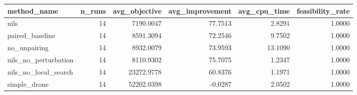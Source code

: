 \begin{tabular}{lrrrrr}
\toprule
method_name & n_runs & avg_objective & avg_improvement & avg_cpu_time & feasibility_rate \\
\midrule
nils & 14 & 7190.0047 & 77.7513 & 2.8291 & 1.0000 \\
paired_baseline & 14 & 8591.3094 & 72.2546 & 9.7502 & 1.0000 \\
no_unpairing & 14 & 8932.0079 & 73.9593 & 13.1090 & 1.0000 \\
nils_no_perturbation & 14 & 8110.9302 & 75.7075 & 1.2347 & 1.0000 \\
nils_no_local_search & 14 & 23272.9778 & 60.8376 & 1.1971 & 1.0000 \\
simple_drone & 14 & 52202.0398 & -0.0287 & 2.0502 & 1.0000 \\
\bottomrule
\end{tabular}
